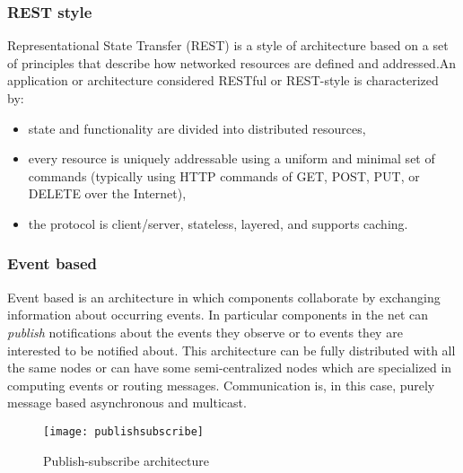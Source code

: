 \subsubsection{REST style} Representational State Transfer (REST) is a style of architecture based on a set of principles that describe how networked resources are defined and addressed.An application or architecture considered RESTful or REST-style is characterized by:
\begin{itemize}
	\item state and functionality are divided into distributed resources,
	\item every resource is uniquely addressable using a uniform and minimal set of commands (typically using HTTP commands of GET, POST, PUT, or DELETE over the Internet),
	\item the protocol is client/server, stateless, layered, and supports caching.
\end{itemize}



\subsubsection{Event based} Event based is an architecture in which components collaborate by exchanging information about occurring events. In particular components in the net can \textit{publish} notifications about the events they observe or  to events they are interested to be notified about. This architecture can be fully distributed with all the same nodes or can have some semi-centralized nodes which are specialized in computing events or routing messages. Communication is, in this case, purely message based asynchronous and multicast. 
\begin{figure}[h]
	\centering
	\texttt{[image: publishsubscribe]}
	\caption{Publish-subscribe architecture}
	\label{fig:2.14}
\end{figure} \\\\\\


